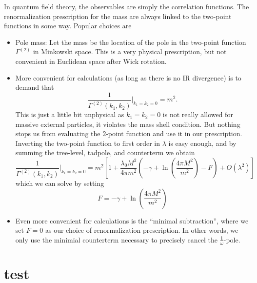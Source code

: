 \documentclass[12pt]{article}
\begin{document}
In quantum field theory, the observables are simply the correlation
functions. The renormalization prescription for the mass are always
linked to the two-point functions in some way. Popular choices are
\begin{itemize}
\item Pole mass: Let the mass be the location of the pole in the
  two-point function $\Gamma^{(2)}$ in Minkowski space. This is a very
  physical prescription, but not convenient in Euclidean space after
  Wick rotation.
\item More convenient for calculations (as long as there is no IR
  divergence) is to demand that
  \begin{equation}
    \frac{1}{\Gamma^{(2)}(k_1,k_2)} \Big|_{k_1=k_2=0} = m^2.
  \end{equation}
  This is just a little bit unphysical as $k_1=k_2=0$ is not really
  allowed for massive external particles, it violates the mass shell
  condition. But nothing stops us from evaluating the $2$-point
  function and use it in our prescription. Inverting the two-point
  function to first order in $\lambda$ is easy enough, and by summing
  the tree-level, tadpole, and counterterm we obtain
  \begin{equation}
    \frac{1}{\Gamma^{(2)}(k_1,k_2)} \Big|_{k_1=k_2=0} =
    m^2 \left[
      1 + 
      \frac{\lambda_0 M^2}{4\pi m^2} \left(
        -\gamma + 
        \ln\left(\frac{4\pi M^2}{m^2}\right) - F
      \right)
      + O(\lambda^2)
    \right]
  \end{equation}
  which we can solve by setting
  \begin{equation}
    F = -\gamma + \ln\left(\frac{4\pi M^2}{m^2}\right)
  \end{equation}
\item Even more convenient for calculations is the ``minimal
  subtraction'', where we set $F=0$ as our choice of renormalization
  prescription. In other words, we only use the minimial counterterm
  necessary to precisely cancel the $\frac{1}{\omega}$-pole.
\end{itemize}





\newpage
\appendix

\section{test}



 
\renewcommand{\refname}{Bibliography}

\end{document}
